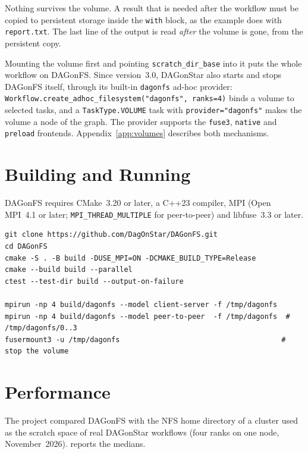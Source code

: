 \begin{cautionbox}
Nothing survives the volume. A result that is needed after the workflow must
be copied to persistent storage inside the \texttt{with} block, as the
example does with \texttt{report.txt}. The last line of the output is read
\emph{after} the volume is gone, from the persistent copy.
\end{cautionbox}

\begin{sloppypar}
Mounting the volume first and pointing \texttt{scratch\_dir\_base} into it
puts the whole workflow on DAGonFS. Since version~3.0, DAGonStar also starts and
stops DAGonFS itself, through its built-in \texttt{dagonfs} ad-hoc provider:
\texttt{Workflow.create\_adhoc\_filesystem("dagonfs", ranks=4)} binds a volume
to selected tasks, and a \texttt{TaskType.VOLUME} task with
\texttt{provider="dagonfs"} makes the volume a node of the graph. The provider
supports the \texttt{fuse3}, \texttt{native} and \texttt{preload} frontends.
Appendix~\ref{app:volumes} describes both mechanisms.
\end{sloppypar}

\section{Building and Running}

DAGonFS requires CMake~3.20 or later, a C++23 compiler, MPI (Open MPI~4.1 or
later; \texttt{MPI\_THREAD\_MULTIPLE} for peer-to-peer) and libfuse~3.3 or
later.

\begin{lstlisting}[style=bash]
git clone https://github.com/DagOnStar/DAGonFS.git
cd DAGonFS
cmake -S . -B build -DUSE_MPI=ON -DCMAKE_BUILD_TYPE=Release
cmake --build build --parallel
ctest --test-dir build --output-on-failure

mpirun -np 4 build/dagonfs --model client-server -f /tmp/dagonfs
mpirun -np 4 build/dagonfs --model peer-to-peer  -f /tmp/dagonfs  # /tmp/dagonfs/0..3
fusermount3 -u /tmp/dagonfs                                      # stop the volume
\end{lstlisting}

\section{Performance}

The project compared DAGonFS with the NFS home directory of a cluster used as
the scratch space of real DAGonStar workflows (four ranks on one node,
November~2026).  reports the medians.

